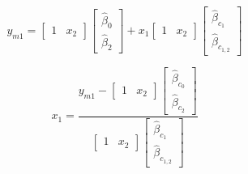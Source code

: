 \documentclass[../../paper.tex]{subfiles}
\begin{document}
\begin{equation}
  y_{m1} =
  \begin{bmatrix}
    1 & x_{2}
  \end{bmatrix}
  \begin{bmatrix}
    \hat{\beta}_{0} \\
    \hat{\beta}_{2}
  \end{bmatrix} +
  x_{1}
  \begin{bmatrix}
    1 & x_{2}
  \end{bmatrix}
  \begin{bmatrix}
    \hat{\beta}_{c_1} \\
    \hat{\beta}_{c_{1,2}}
  \end{bmatrix}
\end{equation}

\begin{equation}
  x_{1} =
  \frac{
    y_{m1} -
    \begin{bmatrix}
        1 & x_{2}
      \end{bmatrix}
      \begin{bmatrix}
        \hat{\beta}_{c_0} \\
        \hat{\beta}_{c_2}
      \end{bmatrix}
    }{
    \begin{bmatrix}
      1 & x_{2}
    \end{bmatrix}
    \begin{bmatrix}
      \hat{\beta}_{c_1} \\
      \hat{\beta}_{c_{1,2}}
    \end{bmatrix}
    }
\end{equation}
\end{document}
